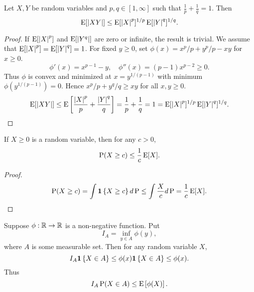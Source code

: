 \begin{theorem}
    Let $X,Y$ be random variables and $p,q\in[1,\infty]$ such that
    $\frac{1}{p} + \frac{1}{q} = 1$. Then 
    \begin{equation*}
        \operatorname{E}[\left\lvert {XY} \right\rvert] \leq \operatorname{E}[\left\lvert {X} \right\rvert^p]^{1/p} \operatorname{E}[\left\lvert {Y} \right\rvert^q]^{1/q}.
    \end{equation*}
\end{theorem}
\begin{proof}
    If $\operatorname{E}[\left\lvert {X} \right\rvert^p]$ and $\operatorname{E}[\left\lvert {Y^q} \right\rvert]$ are zero or infinite, the result is trivial.
    We assume that $\operatorname{E}[\left\lvert {X} \right\rvert^p] = \operatorname{E}[\left\lvert {Y} \right\rvert^q] = 1$. For fixed $y\geq 0$, set 
    $\phi(x) = x^p/p + y^p/p - xy$ for $x\geq 0$. 
    \begin{equation*}
        \phi'(x) = x^{p-1} - y,\quad \phi''(x) = (p-1)x^{p-2}\geq 0.
    \end{equation*}
    Thus $\phi$ is convex and minimized at $x = y^{1/(p-1)}$ with minimum 
    $\phi(y^{1/(p-1)}) = 0$. Hence $x^p/p + y^q/q\geq xy$ for all $x,y\geq 0$.
    \begin{equation*}
        \operatorname{E}[\left\lvert {XY} \right\rvert] \leq \operatorname{E}\left[ {\frac{\left\lvert {X} \right\rvert^p}{p} + \frac{\left\lvert {Y} \right\rvert^q}{q}} \right] 
        = \frac{1}{p} + \frac{1}{q} = 1 = \operatorname{E}[\left\lvert {X} \right\rvert^p]^{1/p} \operatorname{E}[\left\lvert {Y} \right\rvert^q]^{1/q}.
    \end{equation*}
\end{proof}

\begin{theorem}
    If $X\geq 0$ is a random variable, then for any $c>0$, 
    \begin{equation*}
        \operatorname{P}(X\geq c) \leq \frac{1}{c}\operatorname{E}[X].
    \end{equation*}
\end{theorem}
\begin{proof}
    \begin{equation*}
        \operatorname{P}(X\geq c) = \int \mathbf{1}\left\{ {X\geq c} \right\}d\operatorname{P}\leq \int\frac{X}{c}d\operatorname{P} 
        = \frac{1}{c}\operatorname{E}[X].
    \end{equation*}
\end{proof}

\begin{example}
    Suppose $\phi:\mathbb{R}\to\mathbb{R}$ is a non-negative function. Put 
    \begin{equation*}
        I_A = \inf_{y\in A}\phi(y), 
    \end{equation*}
    where $A$ is some measurable set. Then for any random variable $X$, 
    \begin{equation*}
        I_A\mathbf{1}\left\{ {X\in A} \right\}\leq \phi(x)\mathbf{1}\left\{ {X\in A} \right\}\leq\phi(x).
    \end{equation*}
    Thus 
    \begin{equation*}
        I_A\operatorname{P}(X\in A) \leq \operatorname{E}\left[ {\phi(X)} \right]. 
    \end{equation*}
\end{example}

